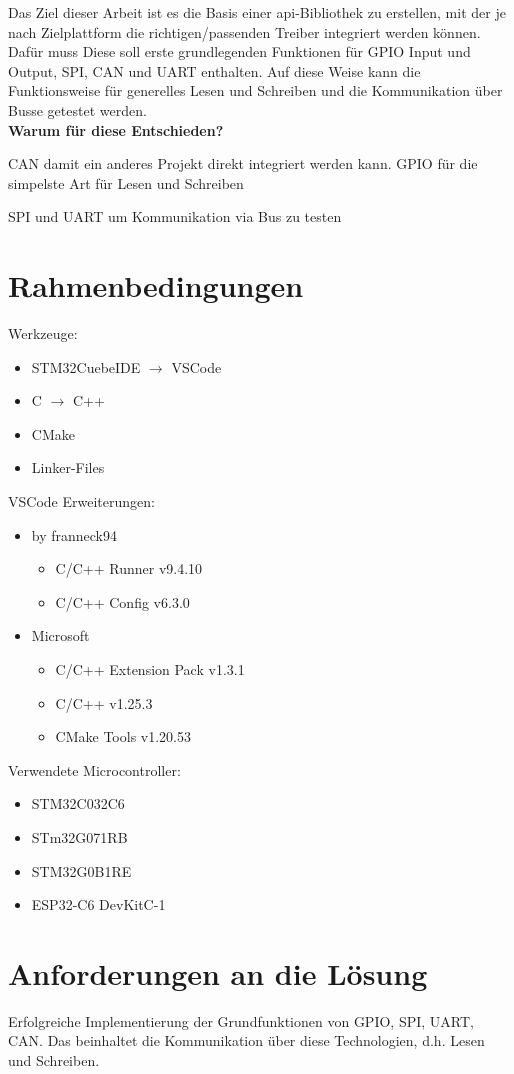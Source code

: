 Das Ziel dieser Arbeit ist es die Basis einer \gls{api}-Bibliothek zu erstellen, mit der je nach Zielplattform die richtigen/passenden Treiber integriert werden können.
Dafür muss 
Diese soll erste grundlegenden Funktionen für GPIO Input und Output, SPI, CAN und UART enthalten. 
Auf diese Weise kann die Funktionsweise für generelles Lesen und Schreiben und die Kommunikation über Busse getestet werden.
\\

\textbf{Warum für diese Entschieden?}

CAN damit ein anderes Projekt direkt integriert werden kann.
GPIO für die simpelste Art für Lesen und Schreiben

SPI und UART um Kommunikation via Bus zu testen




\section{Rahmenbedingungen}
Werkzeuge:
\begin{itemize}
	\item STM32CuebeIDE $\rightarrow$ VSCode
	\item C $\rightarrow$ C++
	\item CMake
	\item Linker-Files
\end{itemize}

VSCode Erweiterungen:
\begin{itemize}
	\item by franneck94
	\begin{itemize}
		\item C/C++ Runner v9.4.10
		\item C/C++ Config v6.3.0
	\end{itemize}
	\item Microsoft
	\begin{itemize}
		\item C/C++ Extension Pack v1.3.1
		\item C/C++ v1.25.3
		\item CMake Tools v1.20.53
	\end{itemize}
\end{itemize}

Verwendete Microcontroller:
\begin{itemize}
	\item STM32C032C6
	\item STm32G071RB
	\item STM32G0B1RE
	\item ESP32-C6 DevKitC-1
\end{itemize}

\section{Anforderungen an die Lösung}
Erfolgreiche Implementierung der Grundfunktionen 
von GPIO, SPI, UART, CAN. Das beinhaltet die Kommunikation über diese Technologien, d.h. Lesen und Schreiben.


